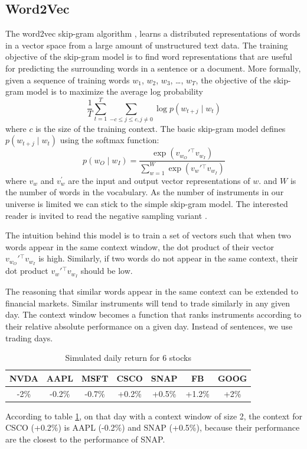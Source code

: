 \documentclass[a4paper, 11pt]{article}
\begin{document}
\subsection{Word2Vec}
The word2vec skip-gram algorithm \cite{DBLP:journals/corr/MikolovSCCD13}, learns a distributed representations of words in a vector space from a large amount of unstructured text data. The training objective of the skip-gram model is to find word representations that are useful for predicting the surrounding words in a sentence or a document. More formally, given a sequence of training words \(w_1\), \(w_2\), \(w_3\), …, \(w_T\), the objective of the skip-gram model is to maximize the average log probability
\begin{equation}
\frac{1}{T}\sum_{t=1}^{T}\sum_{-c\leq j\leq c,j\neq 0} \log{p(w_{t+j}\mid w_t)}
\end{equation}
where \(c\) is the size of the training context. The basic skip-gram model defines \(p(w_{t+j}\mid w_t)\) using the softmax function:
\begin{equation}
p(w_O \mid w_I) = \frac{\exp(v_{w_O}'{ }^\top v_{w_I})}{\sum_{w=1}^{W} \exp(v_{w}'{ }^\top v_{w_I})}
\end{equation}
where \(v_w\) and \(v_w^{'}\) are the input and output vector representations of \(w\). and \(W\) is the number of words in the vocabulary. As the number of instruments in our universe is limited we can stick to the simple skip-gram model. The interested reader is invited to read the negative sampling variant \cite{DBLP:journals/corr/MikolovSCCD13}.

The intuition behind this model is to train a set of vectors such that when two words appear in the same context window, the dot product of their vector \(v_{w_O}'{ }^\top v_{w_I}\) is high. Similarly, if two words do not appear in the same context, their dot product \(v_{w}'{ }^\top v_{w_I}\) should be low.

The reasoning that similar words appear in the same context can be extended to financial markets. Similar instruments will tend to trade similarly in any given day. The context window becomes a function that ranks instruments according to their relative absolute performance on a given day. Instead of sentences, we use trading days.

\begin{table}[htb]
\begin{center}
\begin{tabular}{|c|c|c|c|c|c|c|}
  \hline
  NVDA & AAPL & MSFT & CSCO & SNAP & FB & GOOG \\
  \hline
  -2\% & -0.2\% & -0.7\% & +0.2\% & +0.5\% & +1.2\% & +2\% \\
  \hline
\end{tabular}
\end{center}
\caption{Simulated daily return for 6 stocks}
\label{table:dailyperf}
\end{table}
According to table \ref{table:dailyperf}, on that day with a context window of size 2, the context for CSCO (+0.2\%) is AAPL (-0.2\%) and SNAP (+0.5\%), because their performance are the closest to the performance of SNAP.
\end{document}
